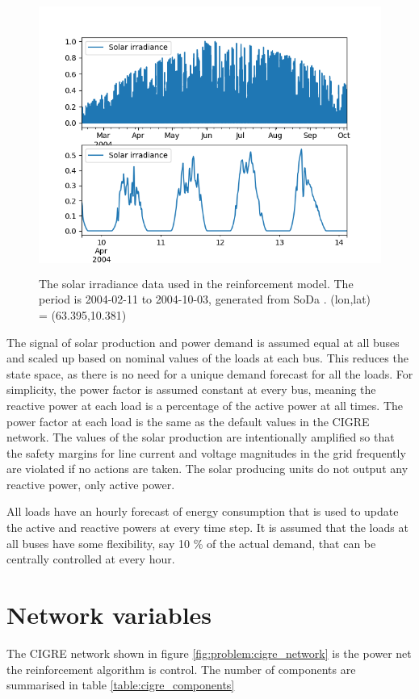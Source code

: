 \documentclass[class=book, crop=false]{standalone}
\begin{document}
\begin{figure}[ht]
    \center
    \includegraphics[height=9cm, width=13.5cm]{figures/solar_data.png}
    \caption[size = 9]{The solar irradiance data used in the reinforcement model. The period is 2004-02-11 to 2004-10-03, generated from SoDa \cite{solar_data}. (lon,lat) = (63.395,10.381) }
    \label{fig:problem:solar_data}
\end{figure}



The signal of solar production and power demand is assumed equal at all buses and scaled up based on nominal values of the loads at each bus. This reduces the state space, as there is no need for a unique demand forecast for all the loads.  For simplicity, the power factor is assumed constant at every bus, meaning the reactive power at each load is a percentage of the active power at all times. The power factor at each load is the same as the default values in the CIGRE network. The values of the solar production are intentionally amplified so that the safety margins for line current and voltage magnitudes in the grid frequently are violated if no actions are taken. The solar producing units do not output any reactive power, only active power. 

All loads have an hourly forecast of energy consumption that is used to update the active and reactive powers at every time step. It is assumed that the loads at all buses have some flexibility, say 10 \% of the actual demand, that can be centrally controlled at every hour.

\section{Network variables}
The CIGRE network shown in figure \ref{fig:problem:cigre_network} is the power net the reinforcement algorithm is control. The number of components are summarised in table \ref{table:cigre_components}
\end{document}
